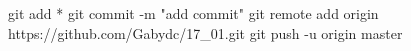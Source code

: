 git add *
git commit -m "add commit"
git remote add origin https://github.com/Gabydc/17_01.git
git push -u origin master
